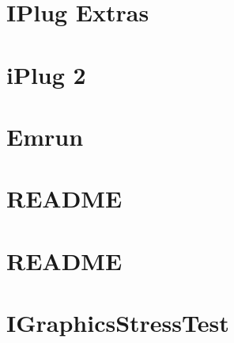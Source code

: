 \let\mypdfximage\pdfximage\def\pdfximage{\immediate\mypdfximage}\documentclass[twoside]{book}
\newcommand{\+}{\discretionary{\mbox{\scriptsize$\hookleftarrow$}}{}{}}
\begin{document}
\chapter{I\+Plug Extras}
\label{md__c_1__users_fab_src__github_branches__neural_amp_modeler_plugin_i_plug2__i_plug__extras__r_e_a_d_m_e}

\chapter{i\+Plug 2}
\label{md__c_1__users_fab_src__github_branches__neural_amp_modeler_plugin_i_plug2__r_e_a_d_m_e}

\chapter{Emrun}
\label{md__c_1__users_fab_src__github_branches__neural_amp_modeler_plugin_i_plug2__scripts_emrun__r_e_a_d_m_e}

\chapter{R\+E\+A\+D\+ME}
\label{md__c_1__users_fab_src__github_branches__neural_amp_modeler_plugin_i_plug2__scripts_icons__r_e_a_d_m_e}

\chapter{R\+E\+A\+D\+ME}
\label{md__c_1__users_fab_src__github_branches__neural_amp_modeler_plugin_i_plug2__scripts_win_reg__r_e_a_d_m_e}

\chapter{I\+Graphics\+Stress\+Test}
\label{md__c_1__users_fab_src__github_branches__neural_amp_modeler_plugin_i_plug2__tests__i_graphics_stress_test__r_e_a_d_m_e}

\end{document}
